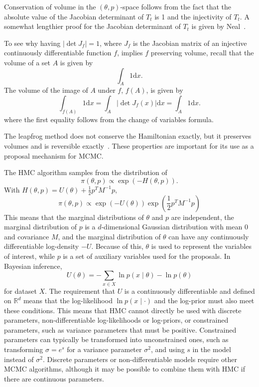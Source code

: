 \documentclass[english,twoside,openright]{HYgraduMLDS}
\newcommand{\R}{\mathbb{R}}
\newcommand{\dx}{\mathrm{d}}
\begin{document}
Conservation of volume in the \((\theta, p)\)-space follows from the fact that 
the absolute value of the Jacobian determinant of \(T_t\) is 1 and the 
injectivity of \(T_t\). A somewhat 
lengthier proof for the Jacobian determinant of \(T_t\) is given by 
Neal~\cite{neal2012mcmc}. 

To see why 
having \(|\det J_f| = 1\), where \(J_f\) is the Jacobian matrix of an injective 
continuously differentiable function \(f\), 
implies \(f\) preserving volume, recall that the volume of a set 
\(A\) is given by 
\[
    \int_A 1\dx x.
\]
The volume of the image of \(A\) under \(f\), \(f(A)\), is given by
\[
    \int_{f(A)}1\dx x = \int_{A}|\det J_f(x)|\dx x = \int_A 1\dx x.
\]
where the first equality follows from the change of variables formula.

The leapfrog method does not conserve the Hamiltonian exactly, but it 
preserves volumes and is reversible exactly~\cite{neal2012mcmc}. 
These properties are important for its use as a proposal mechanism for MCMC.

The HMC algorithm samples from the distribution of~\cite{neal2012mcmc}
\[
    \pi(\theta, p) \propto \exp(-H(\theta, p)).
\]
With \(H(\theta, p) = U(\theta) + \frac{1}{2}p^{T}M^{-1}p\),
\[
    \pi(\theta, p) \propto \exp(-U(\theta))\exp\left(\frac{1}{2}p^{T}M^{-1}p\right)
\]
This means that the marginal distributions of \(\theta\) and \(p\) are 
independent, the marginal distribution of \(p\) is a \(d\)-dimensional
Gaussian distribution 
with mean 0 and covariance \(M\), and the marginal distribution of
\(\theta\) can have any continuously differentiable log-density \(-U\).
Because of this, \(\theta\) is used to represent the variables of interest,
while \(p\) is a set of auxiliary variables used for the proposals.
In Bayesian inference,
\[
  U(\theta) = -\sum_{x\in X}\ln p(x\mid \theta) - \ln p(\theta)
\]
for dataset \(X\). The requirement that \(U\) is a continuously differentiable
and defined on \(\R^{d}\) means that the log-likelihood \(\ln p(x\mid \cdot)\)
and the log-prior must also meet these conditions. This means that HMC cannot directly
be used with discrete parameters, non-differentiable log-likelihoods or log-priors,
or constrained parameters, such as variance
parameters that must be positive. Constrained parameters can typically be
transformed into unconstrained ones, such as transforming \(\sigma = e^{s}\)
for a variance parameter \(\sigma^{2}\), and using \(s\) in the model instead
of \(\sigma^{2}\). Discrete parameters or non-differentiable models
require other MCMC algorithms, although it may be possible to combine them
with HMC if there are continuous parameters.
\end{document}
